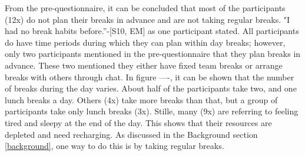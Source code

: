 \documentclass{hasel_thesis}
\begin{document}
From the pre-questionnaire, it can be concluded that most of the participants (12x) do not plan their breaks in advance and are not taking regular breaks. "I had no break habits before.”-[S10, EM] as one participant stated. All participants do have time periods during which they can plan within day breaks; however, only two participants mentioned in the pre-questionnaire that they plan breaks in advance. These two mentioned they either have fixed team breaks or arrange breaks with others through chat. In figure ----, it can be shown that the number of breaks during the day varies. About half of the participants take two, and one lunch breaks a day. Others (4x) take more breaks than that, but a group of participants take only lunch breaks (3x). Stille, many (9x) are referring to feeling tired and sleepy at the end of the day. This shows that their resources are depleted and need recharging. As discussed in the Background section \ref{background}, one way to do this is by taking regular breaks.
\end{document}
